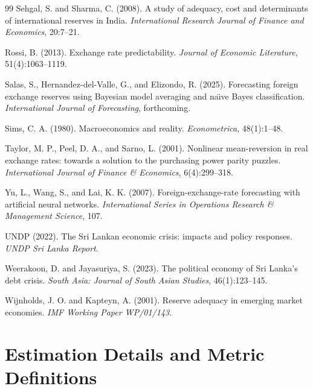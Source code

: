 \documentclass[12pt,a4paper]{article}
\begin{document}
\begin{thebibliography}{99}
Sehgal, S. and Sharma, C. (2008).
\newblock A study of adequacy, cost and determinants of international reserves in India.
\newblock \textit{International Research Journal of Finance and Economics}, 20:7--21.

Rossi, B. (2013).
\newblock Exchange rate predictability.
\newblock \textit{Journal of Economic Literature}, 51(4):1063--1119.

Salas, S., Hernandez-del-Valle, G., and Elizondo, R. (2025).
\newblock Forecasting foreign exchange reserves using Bayesian model averaging and na\"{\i}ve Bayes classification.
\newblock \textit{International Journal of Forecasting}, forthcoming.

Sims, C. A. (1980).
\newblock Macroeconomics and reality.
\newblock \textit{Econometrica}, 48(1):1--48.

Taylor, M. P., Peel, D. A., and Sarno, L. (2001).
\newblock Nonlinear mean-reversion in real exchange rates: towards a solution to the purchasing power parity puzzles.
\newblock \textit{International Journal of Finance \& Economics}, 6(4):299--318.

Yu, L., Wang, S., and Lai, K. K. (2007).
\newblock Foreign-exchange-rate forecasting with artificial neural networks.
\newblock \textit{International Series in Operations Research \& Management Science}, 107.

UNDP (2022).
\newblock The Sri Lankan economic crisis: impacts and policy responses.
\newblock \textit{UNDP Sri Lanka Report}.

Weerakoon, D. and Jayasuriya, S. (2023).
\newblock The political economy of Sri Lanka's debt crisis.
\newblock \textit{South Asia: Journal of South Asian Studies}, 46(1):123--145.

Wijnholds, J. O. and Kapteyn, A. (2001).
\newblock Reserve adequacy in emerging market economies.
\newblock \textit{IMF Working Paper WP/01/143}.

\end{thebibliography}

\appendix

\section{Estimation Details and Metric Definitions}
\end{document}
